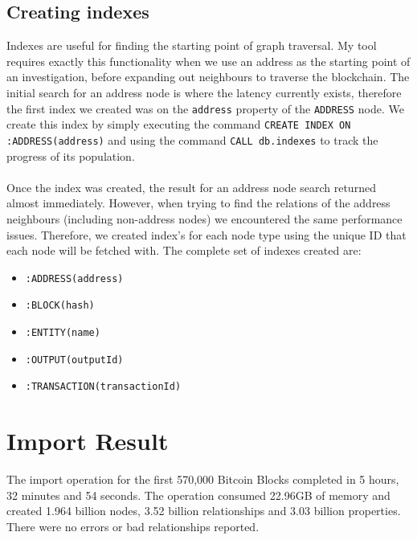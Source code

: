 \subsection{Creating indexes}
Indexes are useful for finding the starting point of graph traversal. My tool requires exactly this functionality when we use an address as the starting point of an investigation, before expanding out neighbours to traverse the blockchain. The initial search for an address node is where the latency currently exists, therefore the first index we created was on the \texttt{address} property of the \texttt{ADDRESS} node. We create this index by simply executing the command \texttt{CREATE INDEX ON :ADDRESS(address)} and using the command \texttt{CALL db.indexes} to track the progress of its population. 
\\\\
Once the index was created, the result for an address node search returned almost immediately. However, when trying to find the relations of the address neighbours (including non-address nodes) we encountered the same performance issues. Therefore, we created index's for each node type using the unique ID that each node will be fetched with. The complete set of indexes created are:
\begin{itemize}
    \item \texttt{:ADDRESS(address)}
    \item \texttt{:BLOCK(hash)}
    \item \texttt{:ENTITY(name)}
    \item \texttt{:OUTPUT(outputId)}
    \item \texttt{:TRANSACTION(transactionId)}
\end{itemize}

\section{Import Result}
The import operation for the first 570,000 Bitcoin Blocks completed in 5 hours, 32 minutes and 54 seconds. The operation consumed 22.96GB of memory and created 1.964 billion nodes, 3.52 billion relationships and 3.03 billion properties. There were no errors or bad relationships reported. 